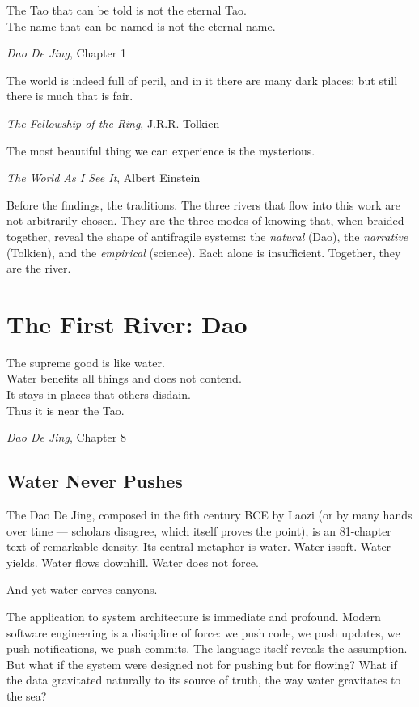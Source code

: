 \documentclass[12pt,a4paper,oneside]{book}
\begin{document}
\epigraph{The Tao that can be told is not the eternal Tao.\\The name that can be named is not the eternal name.}{\textit{Dao De Jing}, Chapter 1}

\epigraph{The world is indeed full of peril, and in it there are many dark places; but still there is much that is fair.}{\textit{The Fellowship of the Ring}, J.R.R. Tolkien}

\epigraph{The most beautiful thing we can experience is the mysterious.}{\textit{The World As I See It}, Albert Einstein}

Before the findings, the traditions. The three rivers that flow into this work are not arbitrarily chosen. They are the three modes of knowing that, when braided together, reveal the shape of antifragile systems: the \emph{natural} (Dao), the \emph{narrative} (Tolkien), and the \emph{empirical} (science). Each alone is insufficient. Together, they are the river.

\chapter{The First River: Dao}

\epigraph{The supreme good is like water.\\Water benefits all things and does not contend.\\It stays in places that others disdain.\\Thus it is near the Tao.}{\textit{Dao De Jing}, Chapter 8}

\section{Water Never Pushes}

The Dao De Jing, composed in the 6th century BCE by Laozi (or by many hands over time --- scholars disagree, which itself proves the point), is an 81-chapter text of remarkable density. Its central metaphor is water. Water issoft. Water yields. Water flows downhill. Water does not force.

And yet water carves canyons.

The application to system architecture is immediate and profound. Modern software engineering is a discipline of force: we push code, we push updates, we push notifications, we push commits. The language itself reveals the assumption. But what if the system were designed not for pushing but for flowing? What if the data gravitated naturally to its source of truth, the way water gravitates to the sea?
\end{document}
